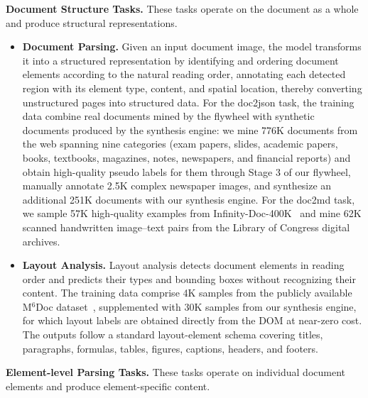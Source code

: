 \textbf{Document Structure Tasks.} These tasks operate on the document as a whole and produce structural representations.

\begin{itemize}[leftmargin=1.0em, labelsep=0.5em]
    \item \textbf{Document Parsing.} Given an input document image, the model transforms it into a structured representation by identifying and ordering document elements according to the natural reading order, annotating each detected region with its element type, content, and spatial location, thereby converting unstructured pages into structured data. For the doc2json task, the training data combine real documents mined by the flywheel with synthetic documents produced by the synthesis engine: we mine 776K documents from the web spanning nine categories (exam papers, slides, academic papers, books, textbooks, magazines, notes, newspapers, and financial reports) and obtain high-quality pseudo labels for them through Stage 3 of our flywheel, manually annotate 2.5K complex newspaper images, and synthesize an additional 251K documents with our synthesis engine. For the doc2md task, we sample 57K high-quality examples from Infinity-Doc-400K~\cite{wang2025infinity} and mine 62K scanned handwritten image–text pairs from the Library of Congress digital archives.

    \item \textbf{Layout Analysis.} Layout analysis detects document elements in reading order and predicts their types and bounding boxes without recognizing their content. The training data comprise 4K samples from the publicly available M$^{6}$Doc dataset~\cite{cheng2023m6doclargescalemultiformatmultitype}, supplemented with 30K samples from our synthesis engine, for which layout labels are obtained directly from the DOM at near-zero cost. The outputs follow a standard layout-element schema covering titles, paragraphs, formulas, tables, figures, captions, headers, and footers.
\end{itemize}

\textbf{Element-level Parsing Tasks.} These tasks operate on individual document elements and produce element-specific content.

